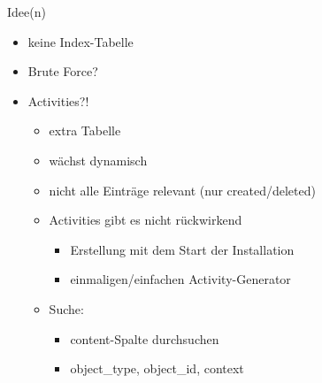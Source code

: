 \documentclass{beamer}
\begin{document}
\begin{frame}{Idee(n)}
    \begin{itemize}
        \item {keine Index-Tabelle\pause~}
        \item {Brute Force?\pause}
        \item {Activities?!\pause}
            \begin{itemize}
                \item {extra Tabelle\pause}
                \item {wächst dynamisch\pause}
                \item {nicht alle Einträge relevant (nur created/deleted)\pause}
                \item {Activities gibt es nicht rückwirkend\pause}
                \begin{itemize}
                    \item {Erstellung mit dem Start der Installation\pause}
                    \item {einmaligen/einfachen Activity-Generator\pause}
                \end{itemize}
                \item {Suche:\pause}
                \begin{itemize}
                    \item {content-Spalte durchsuchen\pause}
                    \item {object\_type, object\_id, context\pause}
                \end{itemize}
            \end{itemize}
    \end{itemize}
\end{frame}

\end{document}
